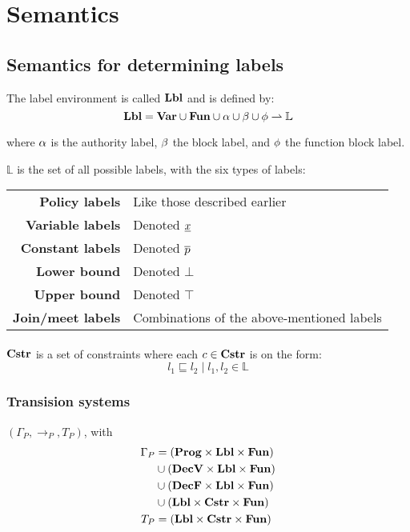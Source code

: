 \section{Semantics}

\subsection{Semantics for determining labels}
The label environment is called $\mathbf{Lbl}$ and is defined by:
\[
  \mathbf{Lbl} = \mathbf{Var} \cup \mathbf{Fun} \cup \alpha \cup \beta \cup \phi \rightharpoonup \mathbb{L}
\]

\noindent where $\alpha$ is the authority label, $\beta$ the block label, and $\phi$ the function block label.

\noindent $\mathbb{L}$ is the set of all possible labels, with the six types of labels: \\

\begin{tabular}{rl}
  \textbf{Policy labels}    & Like those described earlier \\
  \textbf{Variable labels}  & Denoted $\underline{x}$ \\
  \textbf{Constant labels}  & Denoted $\overline{p}$ \\
  \textbf{Lower bound}      & Denoted $\bot$ \\
  \textbf{Upper bound}      & Denoted $\top$ \\
  \textbf{Join/meet labels} & Combinations of the above-mentioned labels
\end{tabular}

\paragraph{}\noindent
$\mathbf{Cstr}$ is a set of constraints where each $c \in \mathbf{Cstr}$ is on the form:
\[ l_1 \sqsubseteq l_2 \; | \; l_1, l_2 \in \mathbb{L} \]


\subsubsection{Transision systems}
$(\Gamma_P, \rightarrow_P, T_P)$, with
\begin{align*}
  \Gamma_P  & = (\mathbf{Prog} \times \mathbf{Lbl} \times \mathbf{Fun}) \\
            & \cup (\mathbf{DecV} \times \mathbf{Lbl} \times \mathbf{Fun}) \\
            & \cup (\mathbf{DecF} \times \mathbf{Lbl} \times \mathbf{Fun}) \\
            & \cup (\mathbf{Lbl} \times \mathbf{Cstr} \times \mathbf{Fun}) \\
  T_P       & = (\mathbf{Lbl} \times \mathbf{Cstr} \times \mathbf{Fun})
\end{align*}

